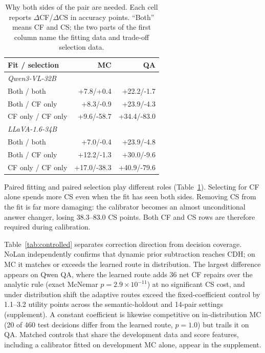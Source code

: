 \documentclass[letterpaper]{article}
\begin{document}
\begin{table}[!b]
\centering
\small
\setlength{\tabcolsep}{2.5pt}
\begin{tabular*}{\columnwidth}{@{\extracolsep{\fill}}lrr@{}}
\toprule
Fit / selection & MC & QA \\
\midrule
\multicolumn{3}{l}{\itshape Qwen3-VL-32B} \\
Both / both & +7.8/+0.4 & +22.2/-1.7 \\
Both / CF only & +8.3/-0.9 & +23.9/-4.3 \\
CF only / CF only & +9.6/-58.7 & +34.4/-83.0 \\
\midrule
\multicolumn{3}{l}{\itshape LLaVA-1.6-34B} \\
Both / both & +7.0/-0.4 & +23.9/-4.8 \\
Both / CF only & +12.2/-1.3 & +30.0/-9.6 \\
CF only / CF only & +17.0/-38.3 & +40.9/-79.6 \\
\bottomrule
\end{tabular*}
\caption{Why both sides of the pair are needed. Each cell reports
$\Delta$CF/$\Delta$CS in accuracy points. ``Both'' means CF and CS; the two
parts of the first column name the fitting data and trade-off selection data.}
\label{tab:paired-calibration}
\end{table}

Paired fitting and paired selection play different roles
(Table~\ref{tab:paired-calibration}). Selecting for CF alone spends more CS even
when the fit has seen both sides. Removing CS from the fit is far more damaging:
the calibrator becomes an almost unconditional answer changer, losing
38.3--83.0 CS points. Both CF and CS rows are therefore required during
calibration.

Table~\ref{tab:controlled} separates correction direction from decision
coverage. NoLan independently confirms that dynamic prior subtraction reaches
CDH; on MC it matches or exceeds the learned route in distribution. The largest
difference appears on Qwen QA, where the learned route adds 36 net CF repairs
over the analytic rule (exact McNemar
$p=2.9\times10^{-11}$) at no significant CS cost, and under distribution shift
the adaptive routes exceed the fixed-coefficient control by 1.1--3.2 utility
points across the semantic-holdout and 14-pair settings (supplement). A
constant coefficient is likewise competitive on in-distribution MC (20 of 460
test decisions differ from the learned route, $p=1.0$) but trails it on QA.
Matched controls that share the development data and score features, including
a calibrator fitted on development MC alone, appear in the supplement.
\end{document}
